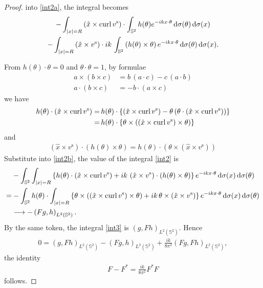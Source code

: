 \begin{proof}
  into \eqref{int2a}, the integral becomes 
  \begin{multline}\label{int2b}
    -\int_{|x|=R}\left(\hat{x}\times\operatorname{curl}{v^\text{s}}\right)\cdot\int_{\mathbb{S}^2}h(\theta) e^{-i k x\cdot\theta}\, \text{d}\sigma(\theta)\,\text{d}\sigma(x) \\-\int_{|x|=R}\left(\hat{x}\times v^\text{s}\right)\cdot ik\, \int_{\mathbb{S}^2}\left(h(\theta)\times\theta\right) e^{-i k x\cdot\theta}\, \text{d}\sigma(\theta) \,\text{d}\sigma(x).
  \end{multline}

  From $h(\theta)\cdot\theta=0$ and $\theta\cdot\theta=1$, by formulae
  \begin{align*}
    a\times(b\times c) &= b\,(a\cdot c) - c\,(a\cdot b) \\
    a\cdot(b\times c) &= -b\cdot(a\times c) 
  \end{align*}
  we have  
  \begin{align*}
    h(\theta)\cdot\left(\hat{x}\times\operatorname{curl}{v^\text{s}}\right)=&\,h(\theta)\cdot\left\{\left(\hat{x}\times\operatorname{curl}{v^\text{s}}\right)-\theta\left(\theta\cdot\left(\hat{x}\times\operatorname{curl}{v^\text{s}}\right)\right)\right\} \\
    =&\,h(\theta)\cdot\left\{\theta\times\left(\left(\hat{x}\times\operatorname{curl}{v^\text{s}}\right)\times\theta\right)\right\} 
  \end{align*}
  and 
  \begin{align*}
    \left(\hat{x}\times v^\text{s}\right)\cdot\left(h(\theta)\times\theta\right) = h(\theta)\cdot\left(\theta\times\left(\hat{x}\times v^\text{s}\right)\right)
  \end{align*}
  Substitute into \eqref{int2b}, the value of the integral \eqref{int2} is  
  \begin{align*}
    &-\int_{\mathbb{S}^2}\int_{|x|=R} \left\{h(\theta)\cdot\left(\hat{x}\times\operatorname{curl}{v^\text{s}}\right)+ik\,\left(\hat{x}\times v^\text{s}\right)\cdot\left(h(\theta)\times\theta\right)\right\} e^{-i k x\cdot\theta}\,\text{d}\sigma(x)\,\text{d}\sigma(\theta) \\
    =&-\int_{\mathbb{S}^2}h(\theta)\cdot\int_{|x|=R}\left\{\theta\times\left(\left(\hat{x}\times\operatorname{curl}{v^\text{s}}\right)\times\theta\right) + ik\,\theta\times\left(\hat{x}\times v^\text{s}\right)\right\} e^{-i k x\cdot\theta}\,\text{d}\sigma(x)\,\text{d}\sigma(\theta) \\
    &\longrightarrow-\left(Fg, h\right)_{L^2(\mathbb{S}^2)}.
  \end{align*}
  By the same token, the integral \eqref{int3} is $\left(g, Fh\right)_{L^2(\mathbb{S}^2)}$. Hence
  \begin{align*}
    0 = \left(g, Fh\right)_{L^2(\mathbb{S}^2)} -\left(Fg, h\right)_{L^2(\mathbb{S}^2)} + \frac{ik}{8\pi^2}\left(Fg, Fh\right)_{L^2(\mathbb{S}^2)},
  \end{align*}
  the identity
  \begin{align*}
    F - F^* = \frac{ik}{8\pi^2} F^*F
  \end{align*}
  follows.
  

\end{proof}
